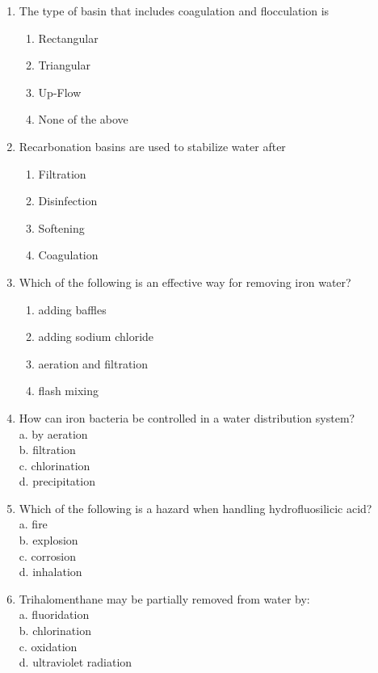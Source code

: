 \begin{enumerate}
\item The type of basin that includes coagulation and flocculation is\\
\begin{enumerate}
\item Rectangular\\
\item Triangular\\
\item Up-Flow\\
\item None of the above
\end{enumerate}

\item Recarbonation basins are used to stabilize water after
\begin{enumerate}
\item Filtration
\item Disinfection
\item Softening
\item Coagulation
\end{enumerate}

\item Which of the following is an effective way for removing iron water?
\begin{enumerate}
\item 	adding baffles
\item 	adding sodium chloride
\item 	aeration and filtration
\item 	flash mixing
\end{enumerate}

\item How can iron bacteria be controlled in a water distribution system?\\
a.	by aeration\\
b.	filtration\\
c.	chlorination\\
d.	precipitation

\item Which of the following is a hazard when handling hydrofluosilicic acid?\\
a.	fire\\
b.	explosion\\
c.	corrosion\\
d.	inhalation\\

\item Trihalomenthane may be partially removed from water by:\\
a.	fluoridation\\
b.	chlorination\\
c.	oxidation\\
d.	ultraviolet radiation\\


\end{enumerate}
